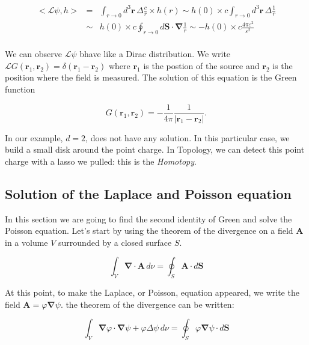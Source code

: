 \documentclass[final, paper=letter,5p,times,twocolumn]{elsarticle}
\theoremstyle{definition}
\begin{document}
\begin{equation}
  \begin{array}{rcl}
    <\mathcal{L} \psi, h > & = & \int_{r\rightarrow 0} d^{3}\bm{r} \, \Delta \frac{c}{r} \times h(r) \sim h(0)  \times c \int_{r\rightarrow 0} d^{3}\bm{r} \, \Delta \frac{1}{r} \\
    & \sim &  h(0)  \times c \oint_{r\rightarrow 0} d\bm{S} \cdot \bm{\nabla} \frac{1}{r} \sim - h(0)  \times c \frac{4\pi\varepsilon^{2}}{\varepsilon^{2}} \\
  \end{array}
\end{equation}

We can observe $\mathcal{L} \psi$ bhave like a Dirac distribution. We write $\mathcal{L} G(\bm{r}_{1}, \bm{r}_{2}) = \delta(\bm{r}_{1} - \bm{r}_{2})$ where $\bm{r}_{1}$ is the postion of the source and $ \bm{r}_{2}$ is the position where the field is measured. The solution of this equation is the Green function


\begin{equation}
G(\bm{r}_{1}, \bm{r}_{2}) = -\frac{1}{4\pi}\frac{1}{|\bm{r}_{1} - \bm{r}_{2}|}.
\label{eq:Green_Function_laplace}
\end{equation}


In our example, $d=2$, does not have any solution. In this particular case, we build a small disk around the point charge. In Topology, we can detect this point charge with a lasso we pulled: this is the {\it Homotopy}.\\


\subsection{Solution of the Laplace and Poisson equation}

In this section we are going to find the second identity of Green and solve the Poisson equation. Let's start by using the theorem of the divergence on a field $\bm{A}$ in a volume $V$ surrounded by a closed surface $S$.

$$
\int_{V} \bm{\nabla} \cdot \bm{A} \, d\nu = \oint_{S} \bm{A} \cdot d\bm{S}
$$

At this point, to make the Laplace, or Poisson, equation appeared, we write the field $\bm{A} = \varphi \bm{\nabla} \psi$. the theorem of the divergence can be written:

$$
\int_{V} \bm{\nabla}\varphi \cdot \bm{\nabla} \psi + \varphi \Delta \psi\, d\nu = \oint_{S}\varphi \bm{\nabla} \psi \cdot d\bm{S}
$$
\end{document}
